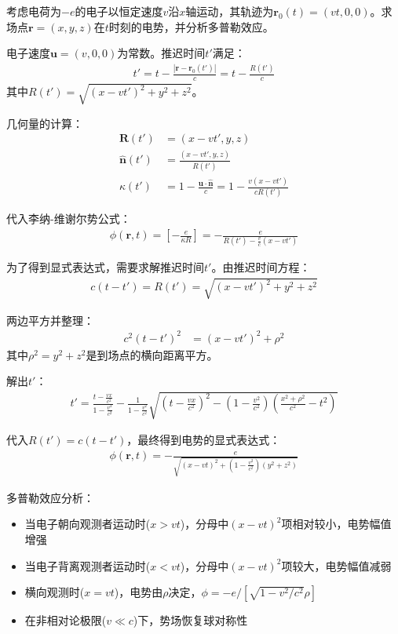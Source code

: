\begin{example}
考虑电荷为$-e$的电子以恒定速度$v$沿$x$轴运动，其轨迹为$\mathbf{r}_0(t) = (vt, 0, 0)$。求场点$\mathbf{r} = (x, y, z)$在$t$时刻的电势，并分析多普勒效应。

电子速度$\mathbf{u} = (v, 0, 0)$为常数。推迟时间$t'$满足：
\begin{align}
t' = t - \frac{|\mathbf{r} - \mathbf{r}_0(t')|}{c} = t - \frac{R(t')}{c}
\end{align}
其中$R(t') = \sqrt{(x - vt')^2 + y^2 + z^2}$。

几何量的计算：
\begin{align}
\mathbf{R}(t') &= (x - vt', y, z) \\
\hat{\mathbf{n}}(t') &= \frac{(x - vt', y, z)}{R(t')} \\
\kappa(t') &= 1 - \frac{\mathbf{u}\cdot\hat{\mathbf{n}}}{c} = 1 - \frac{v(x - vt')}{cR(t')}
\end{align}

代入李纳-维谢尔势公式：
\begin{align}
\phi(\mathbf{r},t) = \left[-\frac{e}{\kappa R}\right] = -\frac{e}{R(t') - \frac{v}{c}(x - vt')}
\end{align}

为了得到显式表达式，需要求解推迟时间$t'$。由推迟时间方程：
\begin{align}
c(t - t') = R(t') = \sqrt{(x - vt')^2 + y^2 + z^2}
\end{align}

两边平方并整理：
\begin{align}
c^2(t - t')^2 &= (x - vt')^2 + \rho^2
\end{align}
其中$\rho^2 = y^2 + z^2$是到场点的横向距离平方。

解出$t'$：
\begin{align}
t' = \frac{t - \frac{vx}{c^2}}{1 - \frac{v^2}{c^2}} - \frac{1}{1 - \frac{v^2}{c^2}}\sqrt{\left(t - \frac{vx}{c^2}\right)^2 - (1 - \frac{v^2}{c^2})\left(\frac{x^2 + \rho^2}{c^2} - t^2\right)}
\end{align}

代入$R(t') = c(t - t')$，最终得到电势的显式表达式：
\begin{align}
\phi(\mathbf{r},t) = -\frac{e}{\sqrt{(x - vt)^2 + (1 - \frac{v^2}{c^2})(y^2 + z^2)}}
\end{align}


多普勒效应分析：
\begin{itemize}
\item 当电子朝向观测者运动时($x > vt$)，分母中$(x - vt)^2$项相对较小，电势幅值增强
\item 当电子背离观测者运动时($x < vt$)，分母中$(x - vt)^2$项较大，电势幅值减弱
\item 横向观测时($x = vt$)，电势由$\rho$决定，$\phi = -e/[\sqrt{1 - v^2/c^2}\rho]$
\item 在非相对论极限($v \ll c$)下，势场恢复球对称性
\end{itemize}

\end{example}


